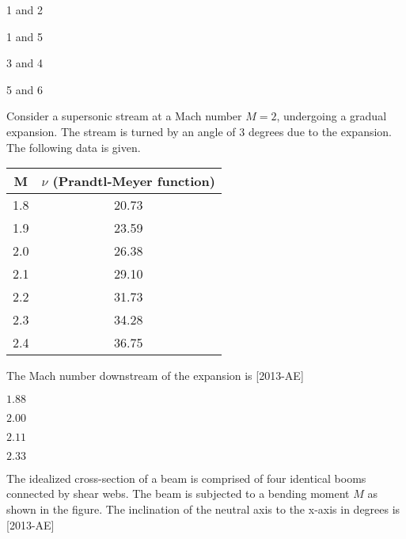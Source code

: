\begin{enumerate}
\begin{multicols}{4}
\item 1 and 2
\item 1 and 5
\item 3 and 4
\item 5 and 6
\end{multicols}
\end{enumerate}
\item Consider a supersonic stream at a Mach number $M=2$, undergoing a gradual expansion. The stream is turned by an angle of $3$ degrees due to the expansion. The following data is given.\\
\begin{tabular}[12pt]{ |c| c|}
    \hline
    \textbf{M} & $\nu$ \textbf{(Prandtl-Meyer function)}\\ 
    \hline
    1.8 & 20.73 \\
    \hline
    1.9 & 23.59 \\
    \hline
    2.0 & 26.38 \\
    \hline
    2.1 & 29.10 \\
    \hline
    2.2 & 31.73 \\
    \hline
    2.3 & 34.28 \\
    \hline
    2.4 & 36.75 \\
    \hline
    \end{tabular}
The Mach number downstream of the expansion is \hfill{[2013-AE]}
\begin{enumerate}
\begin{multicols}{4}
\item $1.88$
\item $2.00$
\item $2.11$
\item $2.33$
\end{multicols}
\end{enumerate}
\item The idealized cross-section of a beam is comprised of four identical booms connected by shear webs. The beam is subjected to a bending moment $M$ as shown in the figure. The inclination of the neutral axis to the x-axis in degrees is \hfill{[2013-AE]}\\
